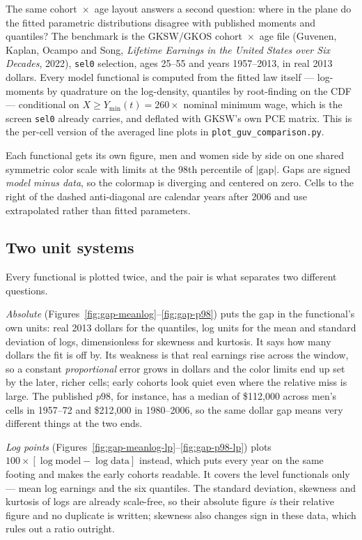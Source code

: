 \documentclass[11pt]{article}
\begin{document}
The same cohort~$\times$~age layout answers a second question: where in the plane do the
fitted parametric distributions disagree with published moments and quantiles? The
benchmark is the GKSW/GKOS cohort~$\times$~age file (Guvenen, Kaplan, Ocampo and Song,
\emph{Lifetime Earnings in the United States over Six Decades}, 2022), \texttt{sel0}
selection, ages 25--55 and years 1957--2013, in real 2013 dollars. Every model
functional is computed from the fitted law itself --- log-moments by quadrature on the
log-density, quantiles by root-finding on the CDF --- conditional on
$X \ge Y_{\min}(t) = 260 \times$ nominal minimum wage, which is the screen \texttt{sel0}
already carries, and deflated with GKSW's own PCE matrix. This is the per-cell version of
the averaged line plots in \texttt{plot\_guv\_comparison.py}.

Each functional gets its own figure, men and women side by side on one shared symmetric
color scale with limits at the 98th percentile of $|\text{gap}|$. Gaps are signed
\emph{model minus data}, so the colormap is diverging and centered on zero. Cells to the
right of the dashed anti-diagonal are calendar years after 2006 and use extrapolated
rather than fitted parameters.

\subsection*{Two unit systems}

Every functional is plotted twice, and the pair is what separates two different questions.

\emph{Absolute} (Figures~\ref{fig:gap-meanlog}--\ref{fig:gap-p98}) puts the gap in the
functional's own units: real 2013 dollars for the quantiles, log units for the mean and
standard deviation of logs, dimensionless for skewness and kurtosis. It says how many
dollars the fit is off by. Its weakness is that real earnings rise across the window, so
a constant \emph{proportional} error grows in dollars and the color limits end up set by
the later, richer cells; early cohorts look quiet even where the relative miss is large.
The published $p98$, for instance, has a median of \$112{,}000 across men's cells in
1957--72 and \$212{,}000 in 1980--2006, so the same dollar gap means very different
things at the two ends.

\emph{Log points} (Figures~\ref{fig:gap-meanlog-lp}--\ref{fig:gap-p98-lp}) plots
$100 \times [\log \text{model} - \log \text{data}]$ instead, which puts every year on the
same footing and makes the early cohorts readable. It covers the level functionals only
--- mean log earnings and the six quantiles. The standard deviation, skewness and
kurtosis of logs are already scale-free, so their absolute figure \emph{is} their
relative figure and no duplicate is written; skewness also changes sign in these data,
which rules out a ratio outright.
\end{document}
